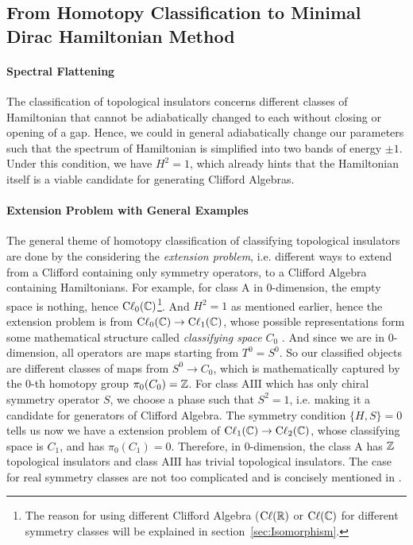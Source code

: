 \documentclass{article}
\begin{document}
\subsection{From Homotopy Classification to Minimal Dirac Hamiltonian Method}
\label{sec:Homotopy to Minimal Dirac}

\paragraph{Spectral Flattening} The classification of topological insulators
concerns different classes of Hamiltonian that cannot be adiabatically changed
to each without closing or opening of a gap. Hence, we could in general
adiabatically change our parameters such that the spectrum of Hamiltonian is
simplified into two bands of energy $\pm1$. Under this condition, we have
$H^2=1$, which already hints that the Hamiltonian itself is a viable candidate
for generating Clifford Algebras. 

\paragraph{Extension Problem with General Examples}
The general theme of homotopy classification of classifying topological
insulators are done by the considering the \textit{extension problem}, i.e.
different ways to extend from a Clifford containing only symmetry operators, to
a Clifford Algebra containing Hamiltonians. For example, for class $\mathrm{A}$
in $0$-dimension, the empty space is nothing, hence
$\mathrm{C\ell}_{0}(\mathbb{C})$\footnote{The reason for using different Clifford
Algebra ($\mathrm{C\ell}(\mathbb{R})$ or $\mathrm{C\ell}(\mathbb{C})$ for different symmetry
classes will be explained in section~\ref{sec:Isomorphism}.}. And $H^2=1$ as
mentioned earlier, hence the extension problem is from
$\mathrm{C\ell}_{0}(\mathbb{C})\to \mathrm{C\ell}_{1}(\mathbb{C})$, whose possible
representations form some mathematical structure called \textit{classifying
space} $C_0$ \cite{Morimoto2013}. And since we are in $0$-dimension, all
operators are maps starting from $T^0=S^0$. So our classified objects are
different classes of maps from $S^0\to C_0$, which is mathematically captured by
the $0$-th homotopy group $\pi_0(C_0)=\mathbb{Z}$. For class $\mathrm{AIII}$ which has
only chiral symmetry operator $S$, we choose a phase such that $S^2=1$, i.e.
making it a candidate for generators of Clifford Algebra. The symmetry condition
$\{H,S\}=0$ tells us now we have a extension problem of
$\mathrm{C\ell}_{1}(\mathbb{C})\to \mathrm{C\ell}_{2}(\mathbb{C})$, whose classifying space is
$C_1$, and has $\pi_0(C_1)=0$. Therefore, in $0$-dimension, the class
$\mathrm{A}$ has $\mathbb{Z}$ topological insulators and class $\mathrm{AIII}$ has
trivial topological insulators. The case for real symmetry classes are not too
complicated and is concisely mentioned in \cite{Morimoto2013}.
\end{document}

